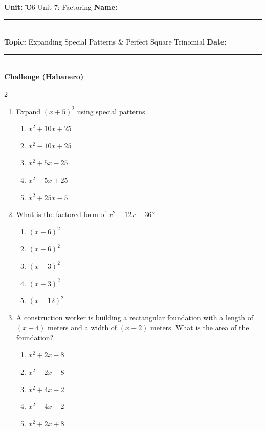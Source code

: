 \documentclass[10pt]{article}
\begin{document}
\enlargethispage{2.5cm}

\begin{tcolorbox}[colback=mainblue!5, colframe=mainblue, sharp corners, boxrule=0.5pt]
    \small \textbf{Unit:} Ὅ6 Unit 7: Factoring \hfill \textbf{Name:} \rule{3cm}{0.4pt} \\
    \small \textbf{Topic:} Expanding Special Patterns & Perfect Square Trinomial \hfill \textbf{Date:} \rule{2cm}{0.4pt} \\
    \centering \textbf{\large Challenge (Habanero)}
\end{tcolorbox}

\vspace{0.2cm}

\begin{multicols}{2}
\begin{enumerate}[label=\textbf{Q\arabic*.}, leftmargin=*, itemsep=6pt, parsep=0pt]

  \item \small Expand $(x + 5)^2$ using special patterns
  \begin{enumerate}[label=(\Alph*), leftmargin=0.6cm, nosep, itemsep=2pt]
    \item $x^2 + 10x + 25$
    \item $x^2 - 10x + 25$
    \item $x^2 + 5x - 25$
    \item $x^2 - 5x + 25$
    \item $x^2 + 25x - 5$
  \end{enumerate}

  \item \small What is the factored form of $x^2 + 12x + 36$?
  \begin{enumerate}[label=(\Alph*), leftmargin=0.6cm, nosep, itemsep=2pt]
    \item $(x + 6)^2$
    \item $(x - 6)^2$
    \item $(x + 3)^2$
    \item $(x - 3)^2$
    \item $(x + 12)^2$
  \end{enumerate}

  \item \small A construction worker is building a rectangular foundation with a length of $(x + 4)$ meters and a width of $(x - 2)$ meters. What is the area of the foundation?
  \begin{enumerate}[label=(\Alph*), leftmargin=0.6cm, nosep, itemsep=2pt]
    \item $x^2 + 2x - 8$
    \item $x^2 - 2x - 8$
    \item $x^2 + 4x - 2$
    \item $x^2 - 4x - 2$
    \item $x^2 + 2x + 8$
  \end{enumerate}


\end{enumerate}
\end{multicols}
\end{document}
